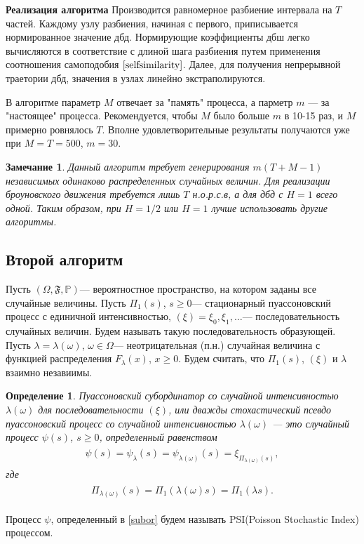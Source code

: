 \documentclass[a4paper,12pt]{article}
\numberwithin{equation}{section}
\newtheorem{Remark}{Замечание}
\newtheorem{Definition}{Определение}
\begin{document}
	\textbf{Реализация алгоритма} \quad Производится равномерное разбиение интервала на $T$ частей. Каждому узлу разбиения, начиная с первого, приписывается нормированное значение дбд. Нормирующие коэффициенты дбш легко вычисляются в соответствие с длиной шага разбиения путем применения соотношения самоподобия $\eqref{selfsimilarity}$. Далее, для получения непрерывной траетории дбд, значения в узлах линейно экстраполируются. 
	
	В алгоритме параметр $M$ отвечает за "память" процесса, а парметр $m$ --- за "настоящее" процесса. Рекомендуется, чтобы $M$ было больше $m$ в 10-15 раз, и $M$ примерно ровнялось $T$. Вполне удовлетворительные результаты получаются уже при $M=T=500$, $m=30$.
	\begin{Remark}
		Данный алгоритм требует генерирования $m(T+M-1)$ независимых одинаково распределенных случайных величин. Для реализации броуновского движения требуется лишь $T$ н.о.р.с.в, а для дбд с $H=1$ всего одной. Таким образом, при $H=1/2$ или $H=1$ лучше использовать другие алгоритмы. 
	\end{Remark}
	\subsection{Второй алгоритм}
	Пусть $(\Omega, \mathfrak{F}, \mathbb{P})$--- вероятностное пространство, на котором заданы все случайные величины. Пусть $\Pi_1(s)$, $s \geq 0$--- стационарный пуассоновский процесс с единичной интенсивностью, $(\xi) = \xi_0, \xi_1, \ldots$--- последовательность случайных величин. Будем называть такую последовательность образующей. Пусть $\lambda = \lambda(\omega)$, $\omega \in \Omega$--- неотрицательная (п.н.) случайная величина с функцией распределения $F_{\lambda}(x)$, $x\geq 0$. Будем считать, что $\Pi_1(s)$, $(\xi)$ и $\lambda$ взаимно незавиимы. 
	\begin{Definition}
		Пуассоновский субординатор со случайной интенсивностью $\lambda(\omega)$ для последовательности $(\xi)$, или дважды стохастический псевдо пуассоновский процесс со случайной интенсивностью $\lambda(\omega)$ --- это случайный процесс $\psi(s)$, $s \geq 0$, определенный равенством 
		\begin{align}
		\begin{split}\label{subor}
		\psi(s) = \psi_{\lambda}(s) = \psi_{\lambda(\omega)}(s) = \xi_{\Pi_{\lambda(\omega)}(s)}, 
		\end{split}
		\end{align} 
		где 
		\begin{align}
		\begin{split}\label{poisson}
		\Pi_{\lambda(\omega)}(s) = \Pi_1(\lambda(\omega)s) = \Pi_1(\lambda s). 
		\end{split}
		\end{align}
	\end{Definition}
	Процесс $\psi$, определенный в \eqref{subor} будем называть PSI(Poisson Stochastic Index) процессом. 
	
\end{document}
